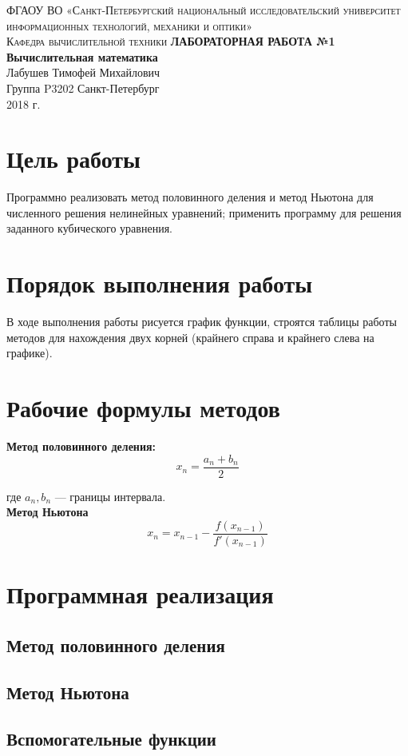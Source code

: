 \documentclass[12pt,a4paper]{report}
\begin{document}
\begin{titlepage}
\begin{center}

\textsc{ФГАОУ ВО «Санкт-Петербургский национальный исследовательский университет информационных технологий, механики и оптики»\\[4mm]
Кафедра вычислительной техники}
\vfill
\textbf{ЛАБОРАТОРНАЯ РАБОТА №1\\[4mm]
Вычислительная математика}\\[16mm]
Лабушев Тимофей Михайлович
\\[2mm]Группа P3202
\vfill
Санкт-Петербург\\[2mm]
2018 г.
\end{center}
\end{titlepage}

\section*{Цель работы}

Программно реализовать метод половинного деления и метод Ньютона для численного
решения нелинейных уравнений; применить программу для решения заданного кубического уравнения.

\section*{Порядок выполнения работы}

В ходе выполнения работы рисуется график функции, строятся таблицы работы
методов для нахождения двух корней (крайнего справа и крайнего слева на графике).

\section*{Рабочие формулы методов}

\textbf{Метод половинного деления:} $$x_n = \frac{a_n + b_n}{2}$$

где $a_n, b_n$ — границы интервала.\\[4mm]

\textbf{Метод Ньютона} $$x_n = x_{n-1} - \frac{f(x_{n-1})}{f'(x_{n-1})}$$

\section*{Программная реализация}

\subsection*{Метод половинного деления}


\subsection*{Метод Ньютона}


\subsection*{Вспомогательные функции}

\end{document}
